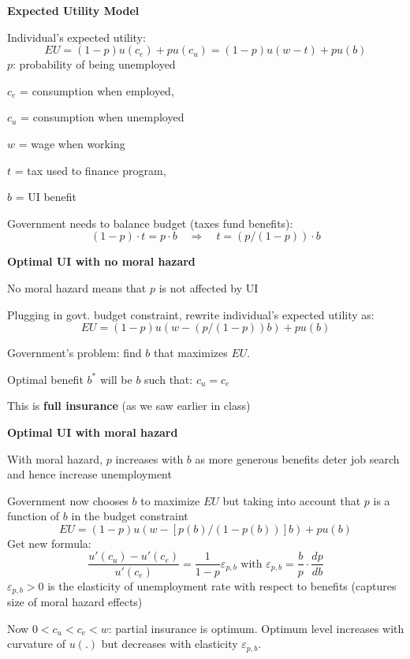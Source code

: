 \documentclass[landscape]{slides}
\begin{document}
\begin{slide}
\begin{center}
{\bf Expected Utility Model}
\end{center}

Individual's expected utility:
\[ EU = (1-p) u(c_e) + p u(c_u) = (1-p)u(w-t) + p u(b) \]
$p$: probability of being unemployed

$c_e$ = consumption when employed,

$c_u$ = consumption when unemployed

$w$ = wage when working

$t$ = tax used to finance program,

$b$ = UI benefit

Government needs to balance budget (taxes fund benefits):
\[(1-p) \cdot t = p \cdot b \quad  \Rightarrow \quad t= (p/(1-p)) \cdot b \]

\end{slide}

\begin{slide}
\begin{center}
{\bf Optimal UI with no moral hazard}
\end{center}
No moral hazard means that $p$ is not affected by UI

Plugging in govt. budget constraint, rewrite individual's expected utility as:
\[ EU = (1-p)u(w-(p/(1-p))b) + p u(b) \]

Government's problem: find $b$ that maximizes $EU$.

Optimal benefit $b^*$ will be $b$ such that: $c_u=c_e$

This is \textbf{full insurance} (as we saw earlier in class)
\end{slide}


\begin{slide}
\begin{center}
{\bf Optimal UI with moral hazard}
\end{center}
With moral hazard, $p$ increases with $b$ as more generous benefits
deter job search and hence increase unemployment

Government now chooses $b$ to maximize $EU$ but taking into account
that $p$ is a function of $b$ in the budget constraint
\[ EU = (1-p)u(w-[p(b)/(1-p(b))]b) + p u(b) \]
Get new formula:
\[ \frac{u'(c_u)-u'(c_e)}{u'(c_e)} = \frac{1}{1-p} \varepsilon_{p,b}   \text{ with }
\varepsilon_{p,b}  = \frac{b}{p} \cdot \frac{dp}{db}\]
$\varepsilon_{p,b}>0$ is the  elasticity of unemployment rate with respect to benefits (captures
size of moral hazard effects)

Now $0<c_u<c_e<w$: partial insurance is optimum. Optimum level increases with curvature of
$u(.)$ but decreases with elasticity $\varepsilon_{p,b}$.

\end{slide}
\end{document}
